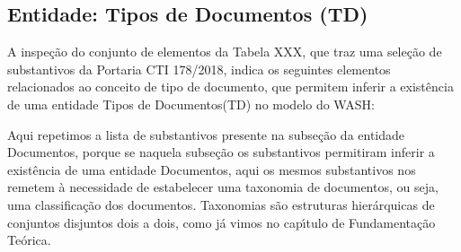 \documentclass[
12pt,		%
openright,	%
twoside,  %
a4paper,			%
chapter=TITLE,		%
english,			%
french,				%
spanish,			%
brazil				%
]{USPSC-classe/USPSC}
\begin{document}
\noindent\begin{center}\mbox{\centering{}}\end{center}


\subsection[Entidade: Tipos de Documentos (TD)]{Entidade: Tipos de Documentos (TD)}\label{Entidade: Tipos de Documentos (TD)}
A inspe\c{c}\~ao do conjunto de elementos da Tabela XXX, que traz uma sele\c{c}\~ao de substantivos da Portaria CTI 178/2018, indica os seguintes elementos relacionados ao conceito de \textquotedbl tipo de documento\textquotedbl , que permitem inferir a exist\^encia de uma entidade \textquotedbl Tipos de Documentos\textquotedbl  (TD) no modelo do WASH:











\noindent\begin{center}\mbox{\centering{}}\end{center}


Aqui repetimos a lista de substantivos presente na subse\c{c}\~ao da entidade \textquotedbl Documentos\textquotedbl , porque se naquela subse\c{c}\~ao os substantivos permitiram inferir a exist\^encia de uma entidade \textquotedbl Documentos\textquotedbl , aqui os mesmos substantivos nos remetem \`a necessidade de estabelecer uma taxonomia de documentos, ou seja, uma classifica\c{c}\~ao dos documentos. Taxonomias s\~ao estruturas hier\'arquicas de conjuntos disjuntos dois a dois, como j\'a vimos no cap\'{\i}tulo de Fundamenta\c{c}\~ao Te\'orica.
\end{document}
